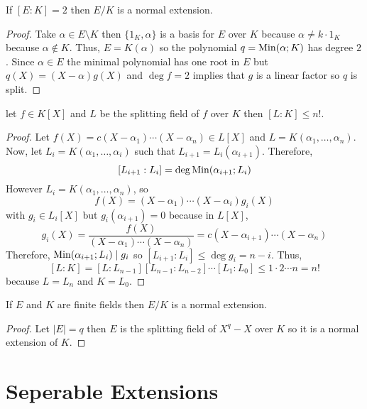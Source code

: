 \documentclass[12pt]{extarticle}
\begin{document}
\begin{proposition}
If $[E : K] = 2$ then $E/K$ is a normal extension.
\end{proposition}

\begin{proof}
Take $\alpha \in E \setminus K$ then $\{1_K, \alpha \}$ is a basis for $E$ over $K$ because $\alpha \neq k \cdot 1_K$ because $\alpha \notin K$. Thus, $E = K(\alpha)$ so the polynomial $q = \mathrm{Min}(\alpha;K)$ has degree $2$. Since $\alpha \in E$ the minimal polynomial has one root in $E$ but $q(X) = (X - \alpha)g(X)$ and $\deg{f} = 2$ implies that $g$ is a linear factor so $q$ is split. 
\end{proof}

\begin{proposition}
let $f \in K[X]$ and $L$ be the splitting field of $f$ over $K$ then $[L : K] \le n!$.
\end{proposition}

\begin{proof}
Let $f(X) = c (X - \alpha_1) \cdots (X - \alpha_n) \in L[X]$ and $L = K(\alpha_1, \dots, \alpha_n)$. Now, let $L_i = K(\alpha_1, \dots, \alpha_i)$ such that $L_{i+1} = L_i ( \alpha_{i+1})$. Therefore, \[[L_{i+1} : L_i] = \deg{\mathrm{Min}(\alpha_{i+1};L_i)}\]
However $L_i = K(\alpha_1, \dots, \alpha_n)$, so 
\[f(X) = (X - \alpha_1) \cdots (X - \alpha_i) g_i(X)\]
with $g_i \in L_i[X]$ but $g_i(\alpha_{i+1}) = 0$ because in $L[X]$, \[g_i(X) = \frac{f(X)}{(X - \alpha_1) \cdots (X - \alpha_n)} = c (X - \alpha_{i+1}) \cdots (X - \alpha_n)\]
Therefore, $\mathrm{Min}(\alpha_{i+1};L_{i}) \mid g_i$ so $[L_{i+1} : L_i] \le \deg{g_i} = n - i$. Thus, \[[L : K] = [L : L_{n-1}] [L_{n-1} : L_{n-2}] \cdots  [L_{1} : L_{0}] \le 1 \cdot 2 \cdots n = n!\]
because $L = L_n$ and $K = L_0$. 
\end{proof}

\begin{proposition}
If $E$ and $K$ are finite fields then $E/K$ is a normal extension.
\end{proposition}

\begin{proof}
Let $|E| = q$ then $E$ is the splitting field of $X^q - X$ over $K$ so it is a normal extension of $K$. 
\end{proof}

\section{Seperable Extensions}
\end{document}
